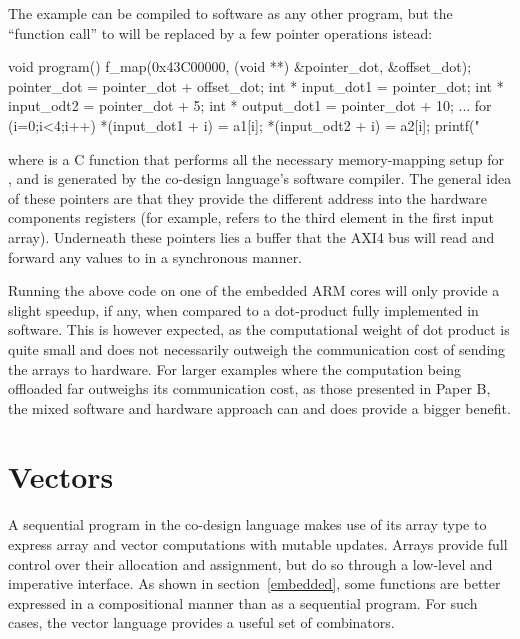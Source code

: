 \documentclass[../paper.tex]{subfiles}
\begin{document}
The example  can be compiled to software as any other program, but the ``function call'' to  will be replaced by a few pointer operations istead:

\begin{code}
void program() {
  f_map(0x43C00000, (void **) &pointer_dot, &offset_dot);
  pointer_dot = pointer_dot + offset_dot;
  int * input_dot1  = pointer_dot;
  int * input_odt2  = pointer_dot + 5;
  int * output_dot1 = pointer_dot + 10;
  ...
  for (i=0;i<4;i++) {
    *(input_dot1 + i) = a1[i];
    *(input_odt2 + i) = a2[i];
  }
  printf("%
}
\end{code}

\noindent where  is a C function that performs all the necessary memory-mapping setup for , and is generated by the co-design language's software compiler. The general idea of these pointers are that they provide the different address into the hardware components registers (for example,  refers to the third element in the first input array). Underneath these pointers lies a buffer that the AXI4 bus will read and forward any values to  in a synchronous manner.

Running the above code on one of the embedded ARM cores will only provide a slight speedup, if any,  when compared to a dot-product fully implemented in software. This is however expected, as the computational weight of dot product is quite small and does not necessarily outweigh the communication cost of sending the arrays to hardware. For larger examples where the computation being offloaded far outweighs its communication cost, as those presented in Paper B, the mixed software and hardware approach can and does provide a bigger benefit.

\section{Vectors}
\label{vectors}

A sequential program in the co-design language makes use of its array type to express array and vector computations with mutable updates. Arrays provide full control over their allocation and assignment, but do so through a low-level and imperative interface. As shown in section~\ref{embedded}, some functions are better expressed in a compositional manner than as a sequential program. For such cases, the vector language provides a useful set of combinators.
\end{document}
